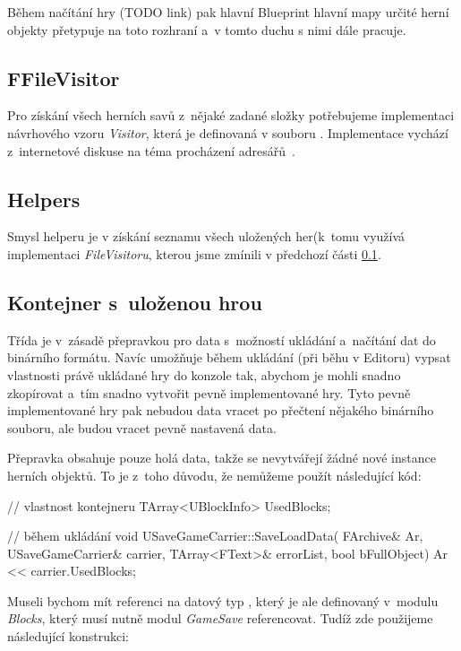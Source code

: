 Během načítání hry (TODO link) pak hlavní Blueprint hlavní mapy určité herní objekty přetypuje na toto rozhraní a~v tomto duchu s nimi dále pracuje.

\subsection{FFileVisitor}
\label{subsec:ffv}
Pro získání všech herních savů z~nějaké zadané složky potřebujeme implementaci návrhového vzoru \textit{Visitor}, která je definovaná v souboru . Implementace vychází z~internetové diskuse na téma procházení adresářů~\citep{ue_iterate_dir}.

\subsection{Helpers}
Smysl helperu  je v získání seznamu všech uložených her\linebreak (k~tomu využívá implementaci \textit{FileVisitoru}, kterou jsme zmínili v předchozí části \ref{subsec:ffv}.

\subsection{Kontejner s~uloženou hrou}
Třída  je v~zásadě přepravkou pro data s~možností ukládání a~načítání dat do binárního formátu. Navíc umožňuje během ukládání (při běhu v Editoru) vypsat vlastnosti právě ukládané hry do konzole tak, abychom je mohli snadno zkopírovat a~tím snadno vytvořit pevně implementované hry. Tyto pevně implementované hry pak nebudou data vracet po přečtení nějakého binárního souboru, ale budou vracet pevně nastavená data. 

Přepravka obsahuje pouze holá data, takže se nevytvářejí žádné nové instance herních objektů. To je z~toho důvodu, že nemůžeme použít následující kód:

\begin{code}

// vlastnost kontejneru
TArray<UBlockInfo> UsedBlocks;

// během ukládání
void USaveGameCarrier::SaveLoadData(
	FArchive& Ar,
	USaveGameCarrier& carrier,
	TArray<FText>& errorList,
	bool bFullObject)
{
	Ar << carrier.UsedBlocks;
}
\end{code}
Museli bychom mít referenci na datový typ , který je ale definovaný v~modulu \textit{Blocks}, který musí nutně modul \textit{GameSave} referencovat. Tudíž zde použijeme následující konstrukci:


